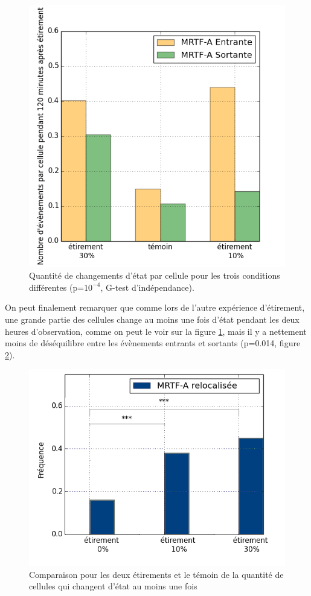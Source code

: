 \begin{figure}
\includegraphics[scale=0.5]{Figures/Etirement30_vs_temoin_activite.png}
\caption{\label{Et30_activite} Quantité de changements d'état par cellule pour les trois conditions différentes (p=$10^{-4}$, G-test d'indépendance).}
\end{figure}

On peut finalement remarquer que comme lors de l'autre expérience d'étirement, une grande partie des cellules change au moins une fois d'état pendant les deux heures d'observation, comme on peut le voir sur la figure \ref{Et30_activite}, mais il y a nettement moins de déséquilibre entre les évènements entrants et sortants (p=0.014, figure \ref{Et30_ES}). 

 \begin{figure}
 \includegraphics[scale=0.5]{Figures/Activite.png} 
 \caption{\label{Et30_ES} Comparaison pour les deux étirements et le témoin de la quantité de cellules qui changent d'état au moins une fois}
 \end{figure}
 
